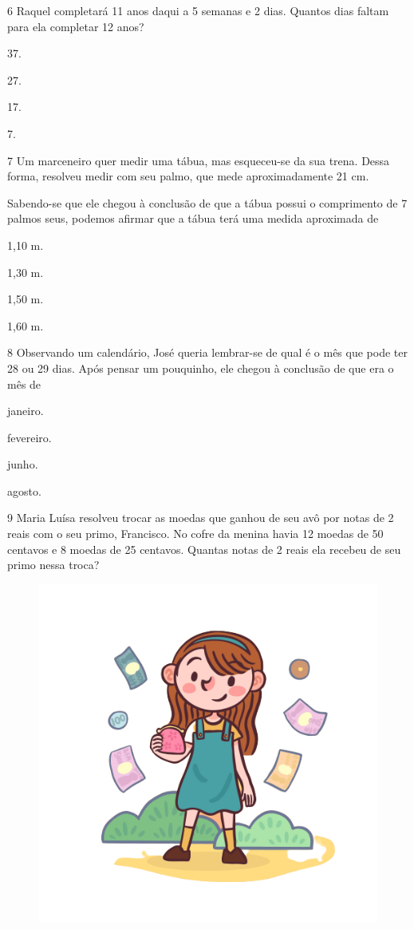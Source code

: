 \num{6} Raquel completará 11 anos daqui a 5 semanas e 2 dias. Quantos dias faltam para ela completar 12 anos?

\begin{multicols}{2}
\begin{escolha}
\item
  37.
\item
  27.
\item
  17.
\item
  7.
\end{escolha}
\end{multicols}

\num{7} Um marceneiro quer medir uma tábua, mas esqueceu-se da sua trena. Dessa forma, resolveu medir com seu palmo, que mede aproximadamente 21 cm.

Sabendo-se que ele chegou à conclusão de que a tábua possui o comprimento de 7 palmos seus, podemos afirmar que a tábua terá uma medida aproximada de

\begin{multicols}{2}
\begin{escolha}
\item
  1,10 m.
\item
  1,30 m.
\item
  1,50 m.
\item
  1,60 m.
\end{escolha}
\end{multicols}

\num{8} Observando um calendário, José queria lembrar-se de qual é o mês que pode ter 28 ou 29 dias. Após pensar um pouquinho, ele chegou à conclusão de que era o mês de

\begin{escolha}
\item
  janeiro.
\item
  fevereiro.
\item
  junho.
\item
  agosto.
\end{escolha}

\pagebreak

\num{9} Maria Luísa resolveu trocar as moedas que ganhou de seu avô por notas de
2 reais com o seu primo, Francisco. No cofre da menina havia 12 moedas de 50
centavos e 8 moedas de 25 centavos. Quantas notas de 2 reais ela recebeu
de seu primo nessa troca?

\begin{figure}[htpb!]
\centering
\includegraphics[width=.5\textwidth]{./media/image104a.png}
\end{figure}

